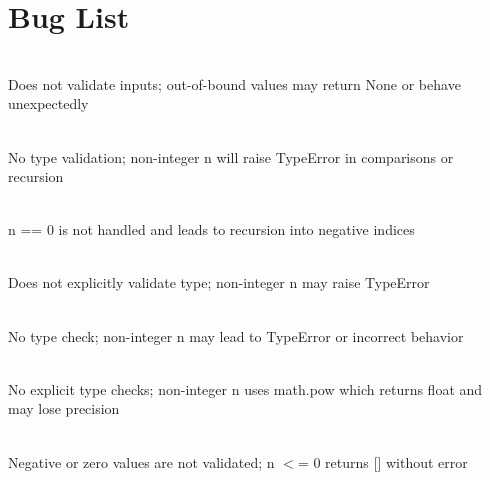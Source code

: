 \chapter{Bug List }
\hypertarget{bug}{}\label{bug}

\begin{DoxyRefList}
\item[doxy Member \doxylink{namespaceintmath_01doxy_abd89b81fe5ae4de57de62dced832c074}{intmath doxy.combination} (n, k)]\hfill \\
\label{bug__bug000007}%
%
Does not validate inputs; out-\/of-\/bound values may return None or behave unexpectedly  
\item[doxy Member \doxylink{namespaceintmath_01doxy_aa97387ce9963cbc6b69f5ae8ea79d242}{intmath doxy.factorial} (n)]\hfill \\
\label{bug__bug000005}%
%
No type validation; non-\/integer n will raise Type\+Error in comparisons or recursion  
\item[doxy Member \doxylink{namespaceintmath_01doxy_a1a119599d699de8882fa0ac88e13b1f0}{intmath doxy.fibbonacci} (n)]\hfill \\
\label{bug__bug000006}%
%
n == 0 is not handled and leads to recursion into negative indices  
\item[doxy Member \doxylink{namespaceintmath_01doxy_ab1dbb3d77d7a365378729893f86dd28e}{intmath doxy.isprime} (n)]\hfill \\
\label{bug__bug000001}%
%
Does not explicitly validate type; non-\/integer n may raise Type\+Error  
\item[doxy Member \doxylink{namespaceintmath_01doxy_ab8e9c8458c34011bb1976eeb19c98f79}{intmath doxy.nextprime} (n)]\hfill \\
\label{bug__bug000002}%
%
No type check; non-\/integer n may lead to Type\+Error or incorrect behavior  
\item[doxy Member \doxylink{namespaceintmath_01doxy_a0bb2e760feac7f0cc056341fd46ae2ba}{intmath doxy.power} (c, n)]\hfill \\
\label{bug__bug000004}%
%
No explicit type checks; non-\/integer n uses math.\+pow which returns float and may lose precision  
\item[doxy Member \doxylink{namespaceintmath_01doxy_aec5f0c177be46bb437e960d931c06da2}{intmath doxy.primefactors} (n)]\hfill \\
\label{bug__bug000003}%
%
Negative or zero values are not validated; n \texorpdfstring{$<$}{<}= 0 returns \mbox{[}\mbox{]} without error 
\end{DoxyRefList}